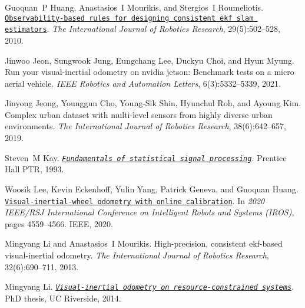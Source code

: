 \begin{DoxyDescription}
\item[\label{_CITEREF_Huang2010IJRR}%
\mbox{[}8\mbox{]}]Guoquan~P Huang, Anastasios~I Mourikis, and Stergios~I Roumeliotis. \href{http://citeseerx.ist.psu.edu/viewdoc/download?doi=10.1.1.228.5851&amp;rep=rep1&amp;type=pdf}{\tt Observability-\/based rules for designing consistent ekf slam estimators}. {\itshape The International Journal of Robotics Research}, 29(5)\+:502--528, 2010.


\item[\label{_CITEREF_Jeon2021RAL}%
\mbox{[}9\mbox{]}]Jinwoo Jeon, Sungwook Jung, Eungchang Lee, Duckyu Choi, and Hyun Myung. Run your visual-\/inertial odometry on nvidia jetson\+: Benchmark tests on a micro aerial vehicle. {\itshape I\+E\+EE Robotics and Automation Letters}, 6(3)\+:5332--5339, 2021.


\item[\label{_CITEREF_Jeong2019IJRR}%
\mbox{[}10\mbox{]}]Jinyong Jeong, Younggun Cho, Young-\/\+Sik Shin, Hyunchul Roh, and Ayoung Kim. Complex urban dataset with multi-\/level sensors from highly diverse urban environments. {\itshape The International Journal of Robotics Research}, 38(6)\+:642--657, 2019.


\item[\label{_CITEREF_Kay1993}%
\mbox{[}11\mbox{]}]Steven~M Kay. \href{http://users.isr.ist.utl.pt/~pjcro/temp/Fundamentals%20Of%20Statistical%20Signal%20Processing%2D%2DEstimation%20Theory-Kay.pdf}{\tt {\itshape Fundamentals of statistical signal processing}}. Prentice Hall P\+TR, 1993.


\item[\label{_CITEREF_Lee2020IROS}%
\mbox{[}12\mbox{]}]Woosik Lee, Kevin Eckenhoff, Yulin Yang, Patrick Geneva, and Guoquan Huang. \href{http://udel.edu/~ghuang/papers/tr_wheel-vio.pdf}{\tt Visual-\/inertial-\/wheel odometry with online calibration}. In {\itshape 2020 I\+E\+E\+E/\+R\+SJ International Conference on Intelligent Robots and Systems (I\+R\+OS)}, pages 4559--4566. I\+E\+EE, 2020.


\item[\label{_CITEREF_Li2013IJRR}%
\mbox{[}13\mbox{]}]Mingyang Li and Anastasios~I Mourikis. High-\/precision, consistent ekf-\/based visual-\/inertial odometry. {\itshape The International Journal of Robotics Research}, 32(6)\+:690--711, 2013.


\item[\label{_CITEREF_Li2014THESIS}%
\mbox{[}14\mbox{]}]Mingyang Li. \href{https://escholarship.org/uc/item/4nn0j264}{\tt {\itshape Visual-\/inertial odometry on resource-\/constrained systems}}. PhD thesis, UC Riverside, 2014.



\end{DoxyDescription}

